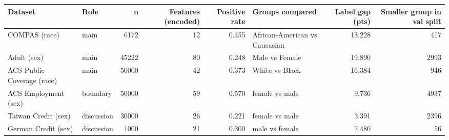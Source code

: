 \begin{tabular}{llrrrlrr}
\toprule
Dataset & Role & n & Features (encoded) & Positive rate & Groups compared & Label gap (pts) & Smaller group in val split \\
\midrule
COMPAS (race) & main & 6172 & 12 & 0.455 & African-American vs Caucasian & 13.228 & 417 \\
Adult (sex) & main & 45222 & 80 & 0.248 & Male vs Female & 19.890 & 2993 \\
ACS Public Coverage (race) & main & 50000 & 42 & 0.373 & White vs Black & 16.384 & 946 \\
ACS Employment (sex) & boundary & 50000 & 59 & 0.570 & female vs male & 9.736 & 4937 \\
Taiwan Credit (sex) & discussion & 30000 & 26 & 0.221 & female vs male & 3.391 & 2396 \\
German Credit (sex) & discussion & 1000 & 21 & 0.300 & male vs female & 7.480 & 56 \\
\bottomrule
\end{tabular}
